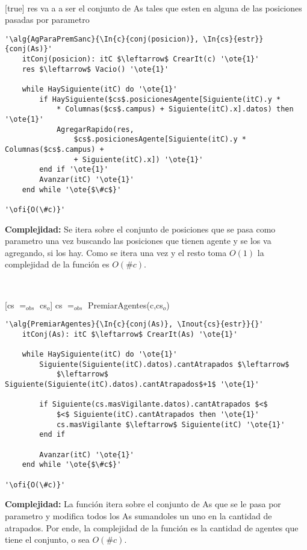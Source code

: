 ~


[true]
{res va a a ser el conjunto de As tales que esten en alguna de las posiciones pasadas por parametro}

\begin{lstlisting}[mathescape]
'\alg{AgParaPremSanc}{\In{c}{conj(posicion)}, \In{cs}{estr}}{conj(As)}'
	itConj(posicion): itC $\leftarrow$ CrearIt(c) '\ote{1}'
	res $\leftarrow$ Vacio() '\ote{1}'

	while HaySiguiente(itC) do '\ote{1}'
		if HaySiguiente($cs$.posicionesAgente[Siguiente(itC).y *
			* Columnas($cs$.campus) + Siguiente(itC).x].datos) then '\ote{1}'
			AgregarRapido(res,
				$cs$.posicionesAgente[Siguiente(itC).y * Columnas($cs$.campus) +
				+ Siguiente(itC).x]) '\ote{1}'
		end if '\ote{1}'
		Avanzar(itC) '\ote{1}'
	end while '\ote{$\#c$}'

'\ofi{O(\#c)}'
\end{lstlisting}

\textbf{Complejidad:} Se itera sobre el conjunto de posiciones que se pasa como parametro una vez buscando las posiciones que tienen agente y se los va agregando, si los hay. Como se itera una vez y el resto toma $O(1)$ la complejidad de la función es $O(\#c)$.

~


[cs $=_{obs}$ cs$_o$]
{cs $=_{obs}$ PremiarAgentes(c,cs$_o$)}

\begin{lstlisting}[mathescape]
'\alg{PremiarAgentes}{\In{c}{conj(As)}, \Inout{cs}{estr}}{}'
	itConj(As): itC $\leftarrow$ CrearIt(As) '\ote{1}'

	while HaySiguiente(itC) do '\ote{1}'
		Siguiente(Siguiente(itC).datos).cantAtrapados $\leftarrow$
			$\leftarrow$ Siguiente(Siguiente(itC).datos).cantAtrapados$+1$ '\ote{1}'

		if Siguiente(cs.masVigilante.datos).cantAtrapados $<$
			$<$ Siguiente(itC).cantAtrapados then '\ote{1}'
			cs.masVigilante $\leftarrow$ Siguiente(itC) '\ote{1}'
		end if

		Avanzar(itC) '\ote{1}'
	end while '\ote{$\#c$}'

'\ofi{O(\#c)}'
\end{lstlisting}

\textbf{Complejidad:} La función itera sobre el conjunto de As que se le pasa por parametro y modifica todos los As sumandoles un uno en la cantidad de atrapados. Por ende, la complejidad de la función es la cantidad de agentes que tiene el conjunto, o sea $O(\#c)$.

